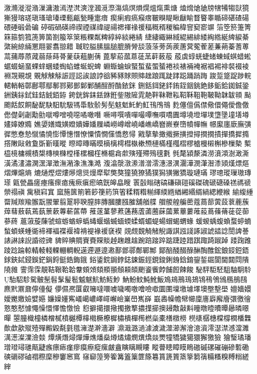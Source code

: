 漵滫漇漎潃漅滽滶漹漜滼漺漟漍漞漈漡熇熐熉熀熅熂熏煻
熆熁熗牄牓犗犕犓獃獍獑獌瑢瑳瑱瑵瑲瑧瑮甀甂甃畽疐瘖
瘈瘌瘕瘑瘊瘔皸瞁睼瞅瞂睮瞀睯睾瞃碲碪碴碭碨硾碫碞碥
碠碬碢碤禘禊禋禖禕禔禓禗禈禒禐稫穊稰稯稨稦窨窫窬竮
箈箜箊箑箐箖箍箌箛箎箅箘劄箙箤箂粻粿粼粺綧綷緂綣綪
緁緀緅綝緎緄緆緋緌綯綹綖綼綟綦綮綩綡緉罳翢翣翥翞耤
聝聜膉膆膃膇膍膌膋舕蒗蒤蒡蒟蒺蓎蓂蒬蒮蒫蒹蒴蓁蓍蒪
蒚蒱蓐蒝蒧蒻蒢蒔蓇蓌蒛蒩蒯蒨蓖蒘蒶蓏蒠蓗蓔蓒蓛蒰
蒑虡蜳蜣蜨蝫蝀蜮蜞蜡蜙蜛蝃蜬蝁蜾蝆蜠蜲蜪蜭蜼蜒蜺蜱
蜵蝂蜦蜧蜸蜤蜚蜰蜑裷裧裱裲裺裾裮裼裶裻裰裬裫覝覡覟
覞觩觫觨誫誙誋誒誏誖谽豨豩賕賏賗趖踉踂跿踍跽踊踃踇
踆踅跾踀踄輐輑輎輍鄣鄜鄠鄢鄟鄝鄚鄤鄡鄛酺酲酹酳銥銤
鉶銛鉺銠銔銪銍銦銚銫鉹銗鉿銣鋮銎銂銕銢鉽銈銡銊銆銌
銙銧鉾銇銩銝銋鈭隞隡雿靘靽靺靾鞃鞀鞂靻鞄鞁靿韎韍頖
颭颮餂餀餇馝馜駃馹馻馺駂馽駇骱髣髧鬾鬿魠魡魟鳱鳲鳵
麧僿儃儰僸儆儇僶僾儋儌僽儊劋劌勱勯噈噂噌嘵噁噊噉噆
噘噚噀嘳嘽嘬嘾嘸嘪嘺圚墫墝墱墠墣墯墬墥墡壿嫿嫴嫽嫷
嫶嬃嫸嬂嫹嬁嬇嬅嬏屧嶙嶗嶟嶒嶢嶓嶕嶠嶜嶡嶚嶞幩幝幠
幜緳廛廞廡彉徲憋憃慹憱憰憢憉憛憓憯憭憟憒憪憡憍慦憳
戭摮摰撖撠撅撗撜撏撋撊撌撣撟摨撱撘敶敺敹敻斲斳暵暰
暩暲暷暪暯樀樆樗槥槸樕槱槤樠槿槬槢樛樝槾樧槲槮樔槷
槧橀樈槦槻樍槼槫樉樄樘樥樏槶樦樇槴樖歑殥殣殢殦氁氀
毿氂潁漦潾澇濆澒澍澉澌潢潏澅潚澖潶潬澂潕潲潒潐潗澔
澓潝漀潡潫潽潧澐潓澋潩潿澕潣潷潪潻熲熯熛熰熠熚熩熵
熝熥熞熤熡熪熜熧熳犘犚獘獒獞獟獠獝獛獡獚獙獢璇璉璊
璆璁瑽璅璈瑼瑹甈甇畾瘥瘞瘙瘝瘜瘣瘚瘨瘛皜皝皞皛瞍
瞏瞉瞈磍碻磏磌磑磎磔磈磃磄磉禚禡禠禜禢禛歶稹窲窴
窳箷篋箾箬篎箯箹篊箵糅糈糌糋緷緛緪緧緗緡縃緺緦緶緱
緰緮緟罶羬羰羭翭翫翪翬翦翨聤聧膣膟膞膕膢膙膗舖艏艓
艒艐艎艑蔤蔻蔏蔀蔩蔎蔉蔍蔟蔊蔧蔜蓻蔫蓺蔈蔌蓴蔪蓲蔕
蓷蓫蓳蓼蔒蓪蓩蔖蓾蔨蔝蔮蔂蓽蔞蓶蔱蔦蓧蓨蓰蓯蓹蔘蔠
蔰蔋蔙蔯虢蝖蝣蝤蝷蟡蝳蝘蝔蝛蝒蝡蝚蝑蝞蝭蝪蝐蝎蝟蝝
蝯蝬蝺蝮蝜蝥蝏蝻蝵蝢蝧蝩衚褅褌褔褋褗褘褙褆褖褑褎褉
覢覤覣觭觰觬諏諆誸諓諑諔諕誻諗誾諀諅諘諃誺誽諙谾豍
貏賥賟賙賨賚賝賧趠趜趡趛踠踣踥踤踮踕踛踖踑踙踦踧踔
踒踘踓踜踗踚輬輤輘輚輠輣輖輗遳遰遯遧遫鄯鄫鄩鄪鄲鄦
鄮醅醆醊醁醂醄醀鋐鋃鋄鋀鋙銶鋏鋱鋟鋘鋩鋗鋝鋌鋯鋂鋨
鋊鋈鋎鋦鋍鋕鋉鋠鋞鋧鋑鋓銵鋡錥鋆銴镼閬閫閮閰隤隢雓
霅霈霂靚鞊鞎鞈韐韏頞頝頦頩頨頠頛頧颲餈飺餑餔餖餗餕
駜駍駏駓駔駎駉駖駘駋駗駌骳髬髫髳髲髱魆魃魧魴魱魦
魶魵魰魨魤魬鳼鳺鳽鳿鳷鴇鴀鳹鳻鴈鴅鴄麃黓鼏鼐儜儓儗
儚儑凞匴叡噰噠噮噳噦噣噭噲噞噷圜圛壈墽壉墿墺壂墼壆
嬗嬙嬛嬡嬔嬓嬐嬖嬨嬚嬠嬞寯嶬嶱嶩嶧嶵嶰嶮嶪嶨嶲嶭
嶯嶴幧幨幦幯廩廧廦廨廥彋徼徻憝憨憖懅憴懆懁懌憺憿憸
憌擗擖擐擏擉撽撉擃擛擳擙攳敿敼斢曈暾曀曊曋曏暽暻暺
曌朣樴橦橉橧樲橨樾橝橭橶橛橑樨橚樻樿橁橪橤橐橏橔橯
橩橠樼橞橖橕橍橎橆歕歔歖殧殪殫毈毇氄氃氆澭濋澣濇澼
濎濈潞濄澽澞濊澨瀄澥澮澺澬澪濏澿澸澢濉澫濍澯澲澰燅
燂熿熸燖燀燁燋燔燊燇燏熽燘熼燆燚燛犝犞獩獦獧獬獥獫
獪瑿璚璠璔璒璕璡甋疀瘯瘭瘱瘽瘳瘼瘵瘲瘰皻盦瞚瞝瞡瞜
瞛瞢瞣瞕瞙瞗磝磩磥磪磞磣磛磡磢磭磟磠禤穄穈穇窶窸窵
窱窷篞篣篧篝篕篥篚篨篹篔篪篢篜篫篘篟糒糔糗糐糑縒縡
